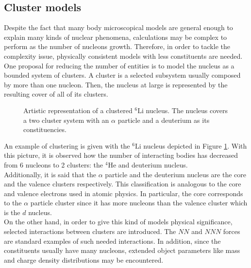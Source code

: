 \documentclass[openany]{book}
\begin{document}
\subsection{Cluster models} \label{sub:microscopical_cluster}

Despite the fact that many body microscopical models are general enough to explain many kinds of nuclear phenomena, calculations may be complex to perform as the number of nucleons growth. Therefore, in order to tackle the complexity issue, physically consistent models with less constituents are needed. \\

One proposal for reducing the number of entities is to model the nucleus as a bounded system of clusters. A cluster is a selected subsystem usually composed by more than one nucleon. Then, the nucleus at large is represented by the resulting cover of all of its clusters.   \\

\begin{figure}[H]
	
	\caption[Clustered $\mathrm{{}^{6}Li}$ nucleus]{Artistic representation of a clustered $\mathrm{{}^{6}Li}$ nucleus. The nucleus covers a two cluster system with an $\alpha$ particle and a deuterium as its constituencies.  }
	\label{fig:microscopical_cluster}
\end{figure}


An example of clustering is given with the $\mathrm{{}^{6}Li}$ nucleus depicted in Figure \ref{fig:microscopical_cluster}. With this picture, it is observed how the number of interacting bodies has decreased from 6 nucleons to 2 clusters: the  $\mathrm{{}^{4}He}$ and deuterium nucleus.  \\

Additionally, it is said that the $\alpha$ particle and the deuterium nucleus are the core and the valence clusters respectively. This classification is analogous to the core and valence electrons used in atomic physics. In particular, the core corresponds to the $\alpha$ particle cluster since it has more nucleons than the valence cluster which is the $d$ nucleus.  \\

On the other hand, in order to give this kind of models physical significance, selected interactions between clusters are introduced. The $NN$ and $NNN$ forces are standard examples of such needed interactions. In addition, since the constituents usually have many nucleons, extended object parameters like mass and charge density distributions may be encountered. \\
\end{document}
